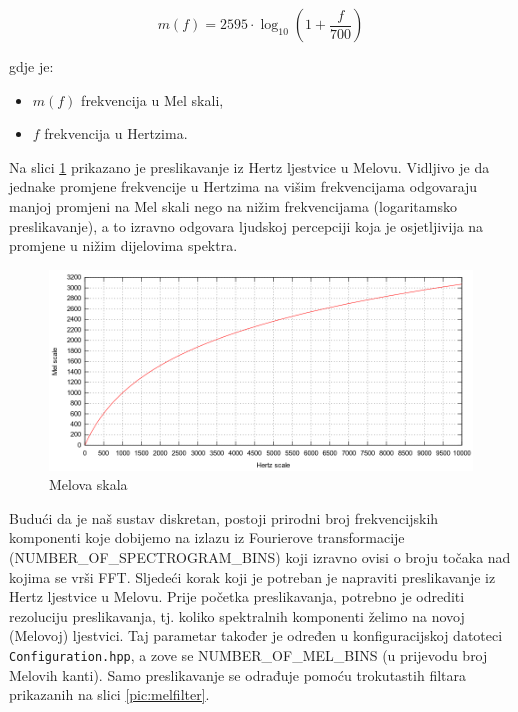 \begin{equation}
    m(f) = 2595 \cdot \log_{10}\left(1 + \frac{f}{700}\right)
    \label{eq:mel}
\end{equation}

gdje je:
\begin{itemize}
    \item \(m(f)\) frekvencija u Mel skali,
    \item \(f\) frekvencija u Hertzima.
\end{itemize}

Na slici \ref{pic:mel} prikazano je preslikavanje iz Hertz ljestvice u Melovu. Vidljivo je da
jednake promjene frekvencije u Hertzima na višim frekvencijama odgovaraju manjoj promjeni 
na Mel skali nego na nižim frekvencijama (logaritamsko preslikavanje), a to izravno
odgovara ljudskoj percepciji koja je osjetljivija na promjene u nižim dijelovima spektra.

\begin{figure}[htb]
    \centering
    \includegraphics[width=0.8\linewidth]{Chapters/struktura_sustava/generiranje_znacajki/mel.png} 
    \caption{Melova skala \cite{mel}}
    \label{pic:mel}
\end{figure}

Budući da je naš sustav diskretan, postoji prirodni broj frekvencijskih komponenti koje 
dobijemo na izlazu iz Fourierove transformacije (NUMBER\_OF\_SPECTROGRAM\_BINS) koji
izravno ovisi o broju točaka nad kojima se vrši FFT. Sljedeći korak koji je potreban je
napraviti preslikavanje iz Hertz ljestvice u Melovu. Prije početka preslikavanja, potrebno
je odrediti rezoluciju preslikavanja, tj. koliko spektralnih komponenti želimo na 
novoj (Melovoj) ljestvici. Taj parametar također je određen u konfiguracijskoj datoteci
\texttt{Configuration.hpp}, a zove se NUMBER\_OF\_MEL\_BINS (u prijevodu broj Melovih
kanti). Samo preslikavanje se odrađuje pomoću trokutastih filtara prikazanih na slici 
\ref{pic:melfilter}.

